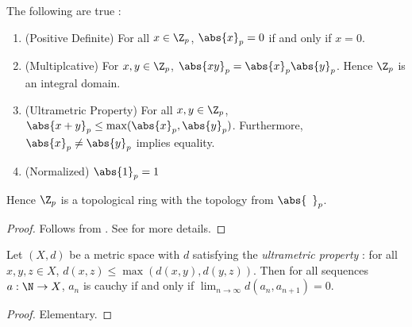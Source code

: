 \begin{prop}
  
  The following are true : 
  \begin{enumerate}
    \item (Positive Definite) 
    For all $x \in \Z_p$, $\abs{x}_p = 0$ if and only if $x = 0$. 
    \item (Multiplcative)
    For $x, y \in \Z_p$, 
    $\abs{x y}_p = \abs{x}_p \abs{y}_p$. 
    Hence $\Z_p$ is an integral domain. 
    \item (Ultrametric Property) 
    For all $x, y \in \Z_p$, 
    $\abs{x + y}_p \leq \max(\abs{x}_p,\abs{y}_p)$.
    Furthermore, $\abs{x}_p \neq \abs{y}_p$ implies equality. 
    \item (Normalized)
    $\abs{1}_p = 1$
  \end{enumerate}
  Hence $\Z_p$ is a topological ring with the topology from $\abs{\hspace{5pt}}_p$. 
\end{prop}
\begin{proof}
  Follows from .
  See  for more details. 
\end{proof}

%  
% 

\begin{prop}
  
  Let $(X,d)$ be a metric space with 
  $d$ satisfying the \emph{ultrametric property} : 
  for all $x, y, z \in X$, $d(x,z) \leq \max(d(x,y),d(y,z))$.
  Then for all sequences $a : \N \to X$, 
  $a_n$ is cauchy if and only if $\lim_{n\to\infty} d(a_n,a_{n+1}) = 0$.
\end{prop}
\begin{proof}
  Elementary. 
\end{proof}

